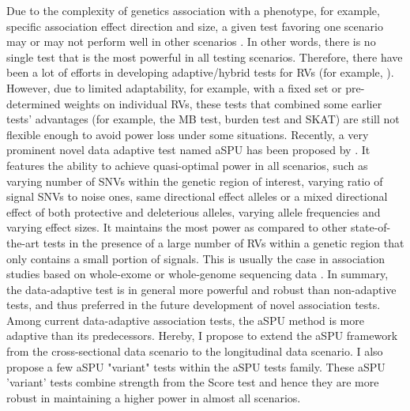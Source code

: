 \documentclass[12pt]{article}
\begin{document}
Due to the complexity of genetics association with a phenotype, for example, specific association effect direction and size, a given test favoring one scenario may or may not perform well in other scenarios \cite{Pan2009,Derkach2013,pan2014powerful,Sun2013}. In other words, there is no single test that is the most powerful in all testing scenarios. Therefore, there have been a lot of efforts  in developing adaptive/hybrid tests for RVs (for example, \cite{Derkach2013,Chen2012,Han2010,Lee2012,Lin2011,Pan2011,Sun2013,Zhang2011}). However, due to limited adaptability, for example, with a fixed set or pre-determined weights on individual RVs, these tests that combined some earlier tests' advantages (for example, the MB test, burden test and SKAT) are still not flexible enough to avoid power loss under some situations. Recently, a very prominent novel data adaptive test named aSPU has been proposed by \cite{pan2014powerful}. It features the ability to achieve quasi-optimal power in all scenarios, such as varying number of SNVs within the genetic region of interest, varying ratio of signal SNVs to noise ones, same directional effect alleles or a mixed directional effect of both protective and deleterious alleles, varying allele frequencies and varying effect sizes. It maintains the most power as compared to other state-of-the-art tests in the presence of a large number of RVs within a genetic region that only contains a small portion of signals. This is usually the case in association studies based on whole-exome or whole-genome sequencing data \cite{pan2014powerful}. In summary, the data-adaptive test is in general more powerful and robust than non-adaptive tests, and thus preferred in the future development of novel association tests. Among current data-adaptive association tests, the aSPU method is more adaptive than its predecessors. Hereby, I propose to extend the aSPU framework from the cross-sectional data scenario to the longitudinal data scenario. I also propose a few aSPU "variant" tests within the aSPU tests family. These aSPU 'variant' tests combine strength from the Score test and hence they are more robust in maintaining a higher power in almost all scenarios.
\end{document}
